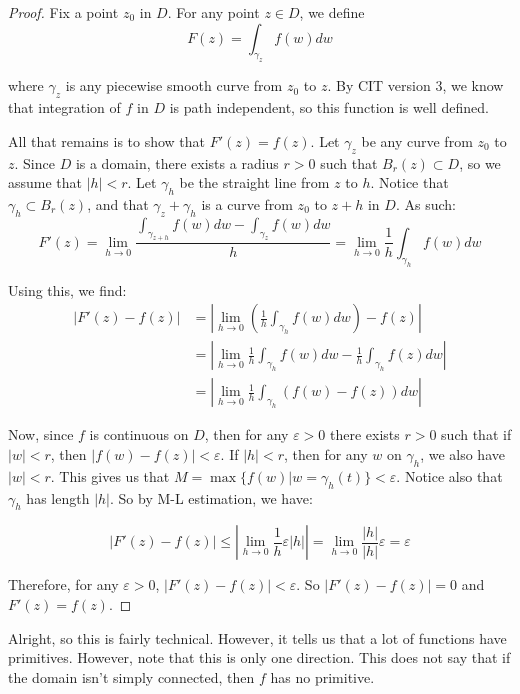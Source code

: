 \begin{proof} Fix a point $z_0$ in $D$. For any point $z\in D$, we define
$$F(z) = \int_{\gamma_z}f(w)dw$$

\noin where $\gamma_z$ is any piecewise smooth curve from $z_0$ to $z$. By CIT version 3, we know that integration of $f$ in $D$ is path independent, so this function is well defined.

All that remains is to show that $F'(z) = f(z)$. Let $\gamma_z$ be any curve from $z_0$ to $z$. Since $D$ is a domain, there exists a radius $r > 0$ such that $B_r(z) \subset D$, so we assume that $|h| < r$. Let $\gamma_h$ be the straight line from $z$ to $h$. Notice that $\gamma_h \subset B_r(z)$, and that $\gamma_z + \gamma_h$ is a curve from $z_0$ to $z + h$ in $D$. As such:
$$F'(z) = \lim_{h\rightarrow 0} \frac{\int_{\gamma_{z+h}} f(w)dw - \int_{\gamma_z}f(w)dw}{h} = \lim_{h\rightarrow 0} \frac{1}{h} \int_{\gamma_h} f(w)dw$$

Using this, we find:
\begin{align*} |F'(z) - f(z)| &= \left|\lim_{h\rightarrow 0} \left(\frac{1}{h} \int_{\gamma_h} f(w)dw\right) - f(z)\right|\\
&=\left|\lim_{h\rightarrow 0} \frac{1}{h} \int_{\gamma_h} f(w)dw - \frac{1}{h}\int_{\gamma_h}f(z)dw\right|\\
&= \left|\lim_{h\rightarrow 0} \frac{1}{h}\int_{\gamma_h} (f(w) - f(z))dw\right|
\end{align*}

Now, since $f$ is continuous on $D$, then for any $\varepsilon > 0$ there exists $r > 0$ such that if $|w| < r$, then $|f(w) - f(z)|<\varepsilon$. If $|h| < r$, then for any $w$ on $\gamma_h$, we also have $|w| < r$. This gives us that $M = \max\{f(w)|w= \gamma_h(t)\} < \varepsilon$. Notice also that $\gamma_h$ has length $|h|$. So by M-L estimation, we have:

$$|F'(z) - f(z)| \le \left| \lim_{h\rightarrow 0} \frac{1}{h}\varepsilon |h|\right|  = \lim_{h\rightarrow 0} \frac{|h|}{|h|}\varepsilon = \varepsilon$$

Therefore, for any $\varepsilon > 0$, $|F'(z) - f(z)| < \varepsilon$. So $|F'(z) - f(z)| = 0$ and $F'(z) = f(z)$.
\end{proof}

Alright, so this is fairly technical. However, it tells us that a lot of functions have primitives. However, note that this is only one direction. This does not say that if the domain isn't simply connected, then $f$ has no primitive.

